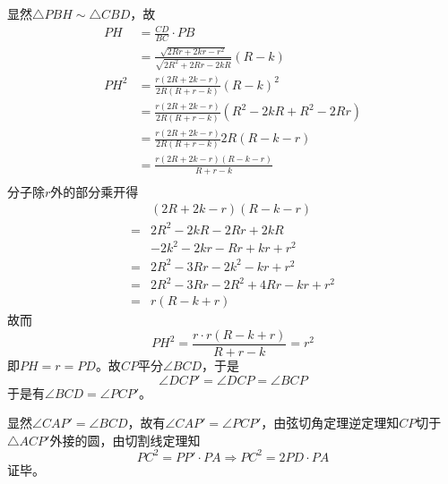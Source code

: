 显然$\triangle PBH \sim \triangle CBD$，故
\begin{align*}
  PH &= \frac{CD}{BC}\cdot PB \\
  &= \frac{\sqrt{2Rr + 2kr - r^2}}{\sqrt{2R^2 + 2Rr - 2kR}}(R - k) \\
  PH^2 &= \frac{r(2R + 2k - r)}{2R(R + r - k)}(R - k)^2 \\
  &= \frac{r(2R + 2k - r)}{2R(R + r - k)}\left(R^2 - 2kR + R^2 - 2Rr\right) \\
  &= \frac{r(2R + 2k - r)}{2R(R + r - k)}2R(R - k - r) \\
  &= \frac{r(2R + 2k - r)(R - k - r)}{R + r - k} \\
\end{align*}
分子除$r$外的部分乘开得
\begin{align*}
  & (2R + 2k - r)(R - k - r) \\
  ={}& 2R^2 - 2kR - 2Rr + 2kR \\
  &- 2k^2 - 2kr - Rr + kr + r^2 \\
  ={}& 2R^2 - 3Rr - 2k^2 - kr + r^2 \\
  ={}& 2R^2 - 3Rr - 2R^2 + 4Rr - kr + r^2 \\
  ={}& r(R - k + r)
\end{align*}
故而
\[ PH^2 = \frac{r\cdot r(R - k + r)}{R + r - k} = r^2 \]
即$PH = r = PD$。故$CP$平分$\angle BCD$，于是
\[ \angle DCP' = \angle DCP = \angle BCP \]
于是有$\angle BCD = \angle PCP'$。

显然$\angle CAP' = \angle BCD$，故有$\angle CAP' = \angle PCP'$，由弦切角定理逆定理知$CP$切于$\triangle ACP'$外接的圆，由切割线定理知
\[ PC^2 = PP'\cdot PA \Rightarrow PC^2 = 2PD\cdot PA \]
证毕。
